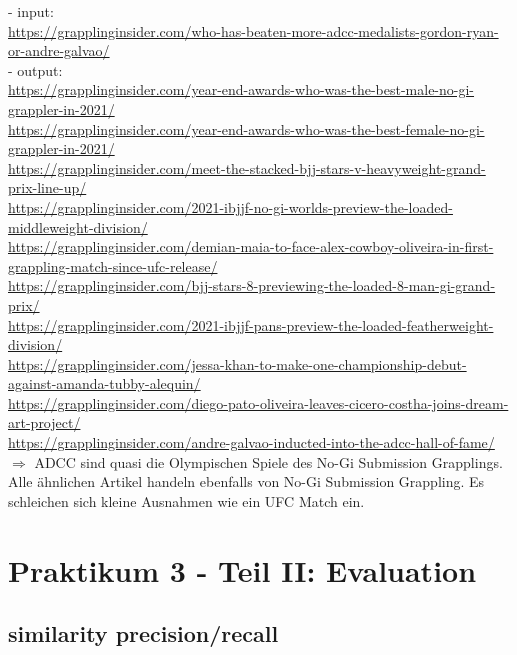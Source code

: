 \noindent- input: \\
{\color{MidnightBlue}
\url{https://grapplinginsider.com/who-has-beaten-more-adcc-medalists-gordon-ryan-or-andre-galvao/}} \\
\noindent- output: \\
{\color{MidnightBlue}
\url{https://grapplinginsider.com/year-end-awards-who-was-the-best-male-no-gi-grappler-in-2021/} \\
\url{https://grapplinginsider.com/year-end-awards-who-was-the-best-female-no-gi-grappler-in-2021/} \\
\url{https://grapplinginsider.com/meet-the-stacked-bjj-stars-v-heavyweight-grand-prix-line-up/} \\
\url{https://grapplinginsider.com/2021-ibjjf-no-gi-worlds-preview-the-loaded-middleweight-division/} \\
\url{https://grapplinginsider.com/demian-maia-to-face-alex-cowboy-oliveira-in-first-grappling-match-since-ufc-release/} \\
\url{https://grapplinginsider.com/bjj-stars-8-previewing-the-loaded-8-man-gi-grand-prix/} \\
\url{https://grapplinginsider.com/2021-ibjjf-pans-preview-the-loaded-featherweight-division/} \\
\url{https://grapplinginsider.com/jessa-khan-to-make-one-championship-debut-against-amanda-tubby-alequin/} \\
\url{https://grapplinginsider.com/diego-pato-oliveira-leaves-cicero-costha-joins-dream-art-project/} \\
\url{https://grapplinginsider.com/andre-galvao-inducted-into-the-adcc-hall-of-fame/}} \\

\noindent$\Rightarrow$ ADCC sind quasi die Olympischen Spiele des No-Gi Submission Grapplings. Alle ähnlichen Artikel handeln ebenfalls von No-Gi Submission Grappling. Es schleichen sich kleine Ausnahmen wie ein UFC Match ein.

\setcounter{section}{2}
\section{Praktikum 3 - Teil II: Evaluation}

\subsection{similarity precision/recall}

